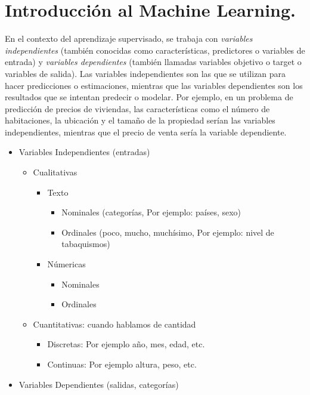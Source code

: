 \documentclass[../main.tex]{subfiles}
\begin{document}

\section{Introducción al Machine Learning.}

    En el contexto del aprendizaje supervisado, se trabaja con \textit{variables independientes} (también conocidas como características, predictores o variables de entrada) y \textit{variables dependientes} (también llamadas variables objetivo o target o variables de salida). Las variables independientes son las que se utilizan para hacer predicciones o estimaciones, mientras que las variables dependientes son los resultados que se intentan predecir o modelar. Por ejemplo, en un problema de predicción de precios de viviendas, las características como el número de habitaciones, la ubicación y el tamaño de la propiedad serían las variables independientes, mientras que el precio de venta sería la variable dependiente.

    \begin{itemize}
        \item Variables Independientes (entradas)
            \begin{itemize}
                \item Cualitativas
                    \begin{itemize}
                        \item Texto
                            \begin{itemize}
                                \item Nominales (categorías, Por ejemplo: países, sexo)
                                \item Ordinales (poco, mucho, muchísimo, Por ejemplo: nivel de tabaquismos)
                                
                            \end{itemize}
                        \item Númericas
                            \begin{itemize}
                                \item Nominales
                                \item Ordinales
                            \end{itemize}
                    \end{itemize}
                \item Cuantitativas: cuando hablamos de cantidad
                    \begin{itemize}
                        \item Discretas: Por ejemplo año, mes, edad, etc.
                        \item Continuas: Por ejemplo altura, peso, etc.
                    \end{itemize}
            \end{itemize}
        \item Variables Dependientes (salidas, categorías)
    \end{itemize}
	
\end{document}
